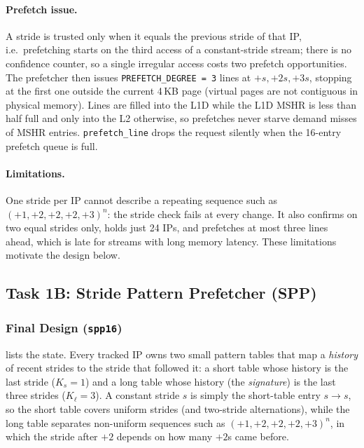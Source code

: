 \documentclass[11pt,a4paper]{article}
\theoremstyle{themethm}
\theoremstyle{themedef}
\theoremstyle{themeex}
\theoremstyle{themerem}
\begin{document}
\paragraph{Prefetch issue.} A stride is trusted only when it equals the
previous stride of that IP, i.e.\ prefetching starts on the third access of a
constant-stride stream; there is no confidence counter, so a single irregular
access costs two prefetch opportunities. The prefetcher then issues
\texttt{PREFETCH\_DEGREE = 3} lines at $+s, +2s, +3s$, stopping at the first
one outside the current 4\,KB page (virtual pages are not contiguous in
physical memory). Lines are filled into the L1D while the L1D MSHR is less
than half full and only into the L2 otherwise, so prefetches never starve
demand misses of MSHR entries. \texttt{prefetch\_line} drops the request
silently when the 16-entry prefetch queue is full.

\paragraph{Limitations.} One stride per IP cannot describe a repeating
sequence such as $(+1,+2,+2,+2,+3)^n$: the stride check fails at every change.
It also confirms on two equal strides only, holds just 24 IPs, and prefetches
at most three lines ahead, which is late for streams with long memory latency.
These limitations motivate the design below.

\subsection{Task 1B: Stride Pattern Prefetcher (SPP)}\label{sec:task1b}

\subsubsection{Final Design (\texttt{spp16})}\label{sec:spp-design}
 lists the state. Every tracked IP owns two small pattern
tables that map a \emph{history} of recent strides to the stride that followed
it: a short table whose history is the last stride ($K_s=1$) and a long table
whose history (the \emph{signature}) is the last three strides ($K_\ell=3$).
A constant stride $s$ is simply the short-table entry $s\to s$, so the short
table covers uniform strides (and two-stride alternations), while the long
table separates non-uniform sequences such as $(+1,+2,+2,+2,+3)^n$, in which
the stride after $+2$ depends on how many $+2$s came before.
\end{document}

